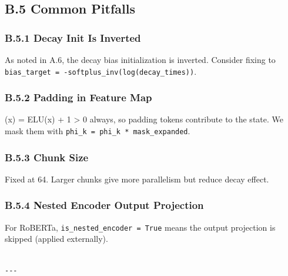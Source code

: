 \subsection{B.5 Common Pitfalls}

\subsubsection{B.5.1 Decay Init Is Inverted}

As noted in A.6, the decay bias initialization is inverted. Consider 
fixing to \texttt{bias\_target = -softplus\_inv(log(decay\_times))}.

\subsubsection{B.5.2 Padding in Feature Map}

 (x) = ELU(x) + 1 > 0 always, so padding tokens contribute to the state. 
We mask them with \texttt{phi\_k = phi\_k * mask\_expanded}.

\subsubsection{B.5.3 Chunk Size}

Fixed at 64. Larger chunks give more parallelism but reduce decay effect.

\subsubsection{B.5.4 Nested Encoder Output Projection}

For RoBERTa, \texttt{is\_nested\_encoder = True} means the output projection is 
skipped (applied externally).
\begin{lstlisting}

---
\end{lstlisting}